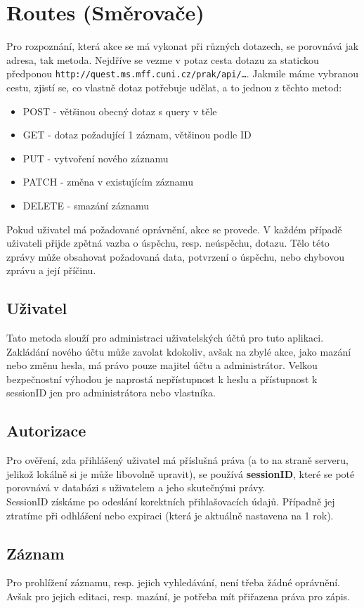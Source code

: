 \section[Routes]{Routes (Směrovače)}
Pro rozpoznání, která akce se má vykonat při různých dotazech, se porovnává
jak adresa, tak metoda. Nejdříve se vezme v potaz cesta dotazu za
statickou předponou \texttt{http://quest.ms.mff.cuni.cz/prak/api/\dots}.
Jakmile máme vybranou cestu, zjistí se, co vlastně dotaz potřebuje udělat, a to jednou z těchto metod:
\begin{itemize}
     \item POST - většinou obecný dotaz s query v těle
     \item GET - dotaz požadující 1 záznam, většinou podle ID
     \item PUT - vytvoření nového záznamu
     \item PATCH - změna v existujícím záznamu
     \item DELETE - smazání záznamu
\end{itemize}
Pokud uživatel má požadované oprávnění, akce se provede. V každém případě
uživateli přijde zpětná vazba o úspěchu, resp. neúspěchu, dotazu. Tělo
této zprávy může obsahovat požadovaná data, potvrzení o úspěchu, nebo
chybovou zprávu a její příčinu.


\subsection{Uživatel}
Tato metoda slouží pro administraci uživatelských účtů pro tuto aplikaci.
Zakládání nového účtu může zavolat kdokoliv, avšak na zbylé akce, jako
mazání nebo změnu hesla, má právo pouze majitel účtu a administrátor.
Velkou bezpečnostní výhodou je naprostá nepřístupnost k heslu a
přístupnost k sessionID jen pro administrátora nebo vlastníka.

\subsection{Autorizace}
Pro ověření, zda přihlášený uživatel má příslušná práva
(a to na straně serveru, jelikož lokálně si je může libovolně upravit), se používá
\textbf{sessionID}, které se poté porovnává v databázi s uživatelem a jeho skutečnými právy.\\
SessionID získáme po odeslání korektních přihlašovacích údajů.
Případně jej ztratíme při odhlášení nebo
expiraci (která je aktuálně nastavena na 1 rok).

\subsection{Záznam}
Pro prohlížení záznamu, resp. jejich vyhledávání, není třeba žádné oprávnění.
Avšak pro jejich editaci, resp. mazání,
je potřeba mít přiřazena práva pro zápis.

